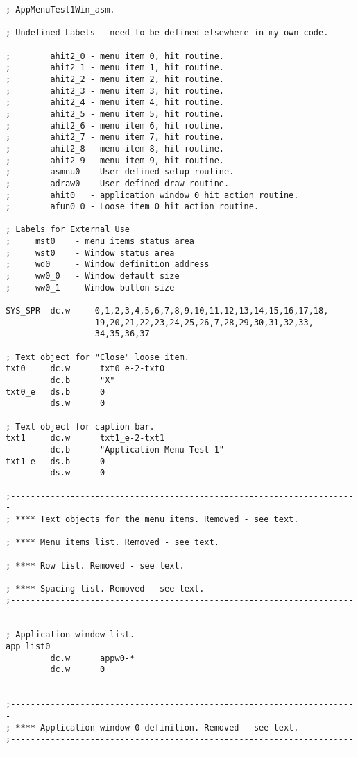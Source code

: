 \begin{lstlisting}[firstnumber=1,caption={AppMenuTest1Win\_asm}]
; AppMenuTest1Win_asm.

; Undefined Labels - need to be defined elsewhere in my own code.

;        ahit2_0 - menu item 0, hit routine.
;        ahit2_1 - menu item 1, hit routine.
;        ahit2_2 - menu item 2, hit routine.
;        ahit2_3 - menu item 3, hit routine.
;        ahit2_4 - menu item 4, hit routine.
;        ahit2_5 - menu item 5, hit routine.
;        ahit2_6 - menu item 6, hit routine.
;        ahit2_7 - menu item 7, hit routine.
;        ahit2_8 - menu item 8, hit routine.
;        ahit2_9 - menu item 9, hit routine.
;        asmnu0  - User defined setup routine.
;        adraw0  - User defined draw routine.
;        ahit0   - application window 0 hit action routine.
;        afun0_0 - Loose item 0 hit action routine.

; Labels for External Use
;     mst0    - menu items status area
;     wst0    - Window status area
;     wd0     - Window definition address
;     ww0_0   - Window default size
;     ww0_1   - Window button size

SYS_SPR  dc.w     0,1,2,3,4,5,6,7,8,9,10,11,12,13,14,15,16,17,18,
                  19,20,21,22,23,24,25,26,7,28,29,30,31,32,33,
                  34,35,36,37

; Text object for "Close" loose item.
txt0     dc.w      txt0_e-2-txt0
         dc.b      "X"
txt0_e   ds.b      0
         ds.w      0

; Text object for caption bar.
txt1     dc.w      txt1_e-2-txt1
         dc.b      "Application Menu Test 1"
txt1_e   ds.b      0
         ds.w      0

;----------------------------------------------------------------------
; **** Text objects for the menu items. Removed - see text.

; **** Menu items list. Removed - see text.

; **** Row list. Removed - see text.

; **** Spacing list. Removed - see text.
;----------------------------------------------------------------------

; Application window list.
app_list0
         dc.w      appw0-*
         dc.w      0


;----------------------------------------------------------------------
; **** Application window 0 definition. Removed - see text.
;----------------------------------------------------------------------



\end{lstlisting}
